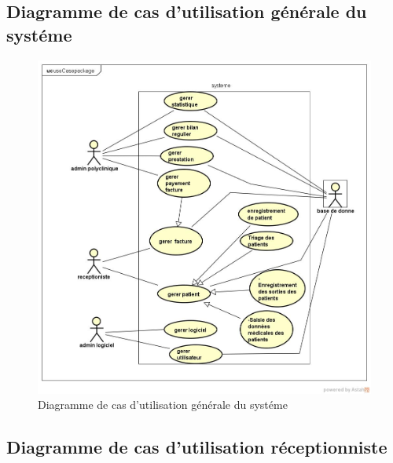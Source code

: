	\subsection{Diagramme de cas d'utilisation générale du systéme}
	\begin{figure}[h]
\includegraphics[scale=0.5]{Chapitre2/images/mainUseCaseDiagramme.jpg}
\caption{Diagramme de cas d'utilisation générale du systéme}
	\end{figure}
	
\newpage

	\subsection{Diagramme de cas d'utilisation réceptionniste }
	  
